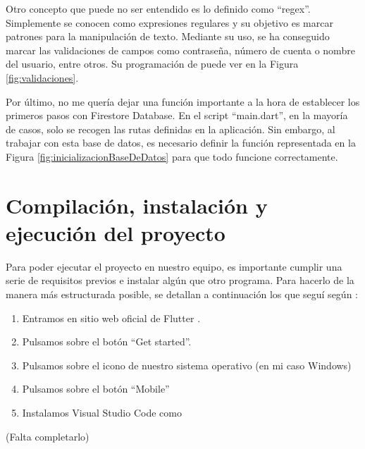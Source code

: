 
	Otro concepto que puede no ser entendido es lo definido como ``regex''. Simplemente se conocen como expresiones regulares y su objetivo es marcar patrones para la manipulación de texto. Mediante su uso, se ha conseguido marcar las validaciones de campos como contraseña, número de cuenta o nombre del usuario, entre otros. Su programación de puede ver en la Figura \ref{fig:validaciones}.
	 

	Por último, no me quería dejar una función importante a la hora de establecer los primeros pasos con Firestore Database. En el script ``main.dart'', en la mayoría de casos, solo se recogen las rutas definidas en la aplicación. Sin embargo, al trabajar con esta base de datos, es necesario definir la función representada en la Figura \ref{fig:inicializacionBaseDeDatos} para que todo funcione correctamente.
	


\section{Compilación, instalación y ejecución del proyecto}

	Para poder ejecutar el proyecto en nuestro equipo, es importante cumplir una serie de requisitos previos e instalar algún que otro programa. Para hacerlo de la manera más estructurada posible, se detallan a continuación los que seguí según \cite{instalacion:flutter}:
	
	\begin{enumerate}
		\item Entramos en sitio web oficial de Flutter \cite{flutter}.
		\item Pulsamos sobre el botón ``Get started''.
		\item Pulsamos sobre el icono de nuestro sistema operativo (en mi caso Windows)
		\item Pulsamos sobre el botón ``Mobile''
		\item Instalamos Visual Studio Code como 
	\end{enumerate}
	
	(Falta completarlo)

